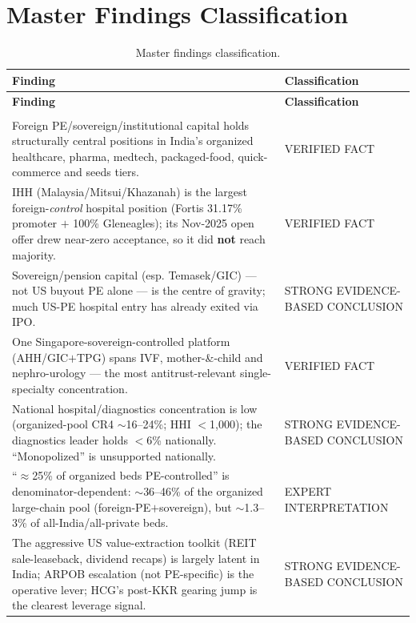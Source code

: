\documentclass[11pt,a4paper]{article}
\begin{document}
\section{Master Findings Classification}\label{sec:findings}
\begin{small}
\setlength{\tabcolsep}{4pt}
\begin{longtable}{>{\raggedright\arraybackslash}p{12.0cm} >{\raggedright\arraybackslash}p{3.2cm}}
\caption{Master findings classification.}\label{tab:findings}\\
\toprule
\textbf{Finding} & \textbf{Classification} \\
\midrule
\endfirsthead
\toprule
\textbf{Finding} & \textbf{Classification} \\
\midrule
\endhead
\midrule \multicolumn{2}{r}{\footnotesize\itshape continued on next page}\\
\endfoot
\bottomrule
\endlastfoot
Foreign PE/sovereign/institutional capital holds structurally central positions in India's organized healthcare, pharma, medtech, packaged-food, quick-commerce and seeds tiers. & VERIFIED FACT \\
IHH (Malaysia/Mitsui/Khazanah) is the largest foreign-\emph{control} hospital position (Fortis 31.17\% promoter $+$ 100\% Gleneagles); its Nov-2025 open offer drew near-zero acceptance, so it did \textbf{not} reach majority. & VERIFIED FACT \\
Sovereign/pension capital (esp. Temasek/GIC) --- not US buyout PE alone --- is the centre of gravity; much US-PE hospital entry has already exited via IPO. & STRONG EVIDENCE-BASED CONCLUSION \\
One Singapore-sovereign-controlled platform (AHH/GIC$+$TPG) spans IVF, mother-\&-child and nephro-urology --- the most antitrust-relevant single-specialty concentration. & VERIFIED FACT \\
National hospital/diagnostics concentration is low (organized-pool CR4 $\sim$16--24\%; HHI $<$1{,}000); the diagnostics leader holds $<$6\% nationally. ``Monopolized'' is unsupported nationally. & STRONG EVIDENCE-BASED CONCLUSION \\
``$\approx$25\% of organized beds PE-controlled'' is denominator-dependent: $\sim$36--46\% of the organized large-chain pool (foreign-PE$+$sovereign), but $\sim$1.3--3\% of all-India/all-private beds. & EXPERT INTERPRETATION \\
The aggressive US value-extraction toolkit (REIT sale-leaseback, dividend recaps) is largely latent in India; ARPOB escalation (not PE-specific) is the operative lever; HCG's post-KKR gearing jump is the clearest leverage signal. & STRONG EVIDENCE-BASED CONCLUSION \\

\end{longtable}
\end{small}
\end{document}

